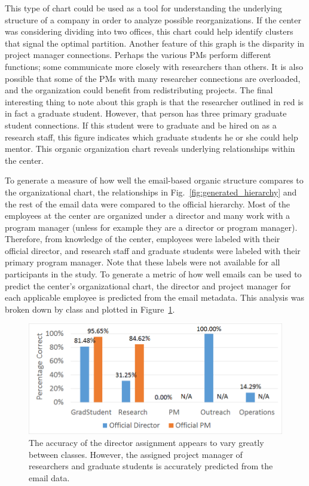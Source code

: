 \documentclass[12pt]{report}
\begin{document}
This type of chart could be used as a tool for understanding the underlying structure of a company in order to analyze possible reorganizations.
If the center was considering dividing into two offices, this chart could help identify clusters that signal the optimal partition.
Another feature of this graph is the disparity in project manager connections.
Perhaps the various PMs perform different functions; some communicate more closely with researchers than others.
It is also possible that some of the PMs with many researcher connections are overloaded, and the organization could benefit from redistributing projects.
The final interesting thing to note about this graph is that the researcher outlined in red is in fact a graduate student.
However, that person has three primary graduate student connections.
If this student were to graduate and be hired on as a research staff, this figure indicates which graduate students he or she could help mentor.
This organic organization chart reveals underlying relationships within the center.

To generate a measure of how well the email-based organic structure compares to the organizational chart, the relationships in Fig.~\ref{fig:generated_hierarchy} and the rest of the email data were compared to the official hierarchy.
Most of the employees at the center are organized under a director and many work with a program manager (unless for example they are a director or program manager).
Therefore, from knowledge of the center, employees were labeled with their official director, and research staff and graduate students were labeled with their primary program manager.
Note that these labels were not available for all participants in the study.
To generate a metric of how well emails can be used to predict the center's organizational chart, the director and project manager for each applicable employee is predicted from the email metadata. 
This analysis was broken down by class and plotted in Figure~\ref{fig:project_classify}.

\begin{figure}[t]
	\centering
	\includegraphics[width=0.8\columnwidth,trim={2mm 2mm 2mm 2mm},clip]{superior_identification}
	\vspace{-7pt}
	\caption[Project manager and director prediction results]{The accuracy of the director assignment appears to vary greatly between classes.  However, the assigned project manager of researchers and graduate students is accurately predicted from the email data.}
	\label{fig:project_classify}
\end{figure}
\end{document}
